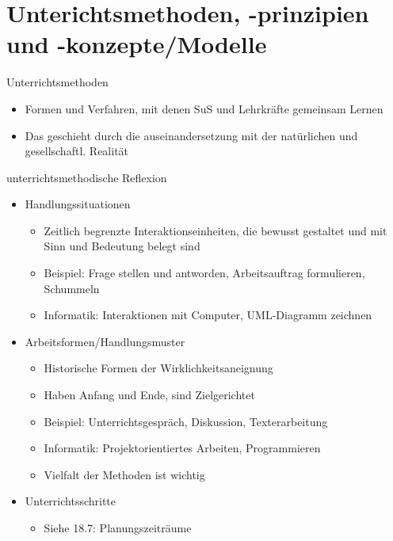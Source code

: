\documentclass{article}
\begin{document}
\section{Unterichtsmethoden, -prinzipien und -konzepte/Modelle}

\begin{block}{Unterrichtsmethoden}
    \begin{itemize}
        \item Formen und Verfahren, mit denen SuS und Lehrkräfte gemeinsam Lernen
        \item Das geschieht durch die auseinandersetzung mit der natürlichen und gesellschaftl. Realität
    \end{itemize}
\end{block}

\begin{block}{unterrichtsmethodische Reflexion}
    \begin{itemize}
        \item Handlungssituationen
        \begin{itemize}
            \item Zeitlich begrenzte Interaktionseinheiten, die bewusst gestaltet und mit Sinn und Bedeutung belegt sind
            \item Beispiel: Frage stellen und antworden, Arbeitsauftrag formulieren, Schummeln
            \item Informatik: Interaktionen mit Computer, UML-Diagramm zeichnen
        \end{itemize}
        \item Arbeitsformen/Handlungsmuster
        \begin{itemize}
            \item Historische Formen der Wirklichkeitsaneignung
            \item Haben Anfang und Ende, sind Zielgerichtet
            \item Beispiel: Unterrichtsgespräch, Diskussion, Texterarbeitung
            \item Informatik: Projektorientiertes Arbeiten, Programmieren
            \item Vielfalt der Methoden ist wichtig
        \end{itemize}
        \item Unterrichtsschritte
        \begin{itemize}
            \item Siehe 18.7: Planungszeiträume
        \end{itemize}

\end{itemize}
\end{block}
\end{document}

